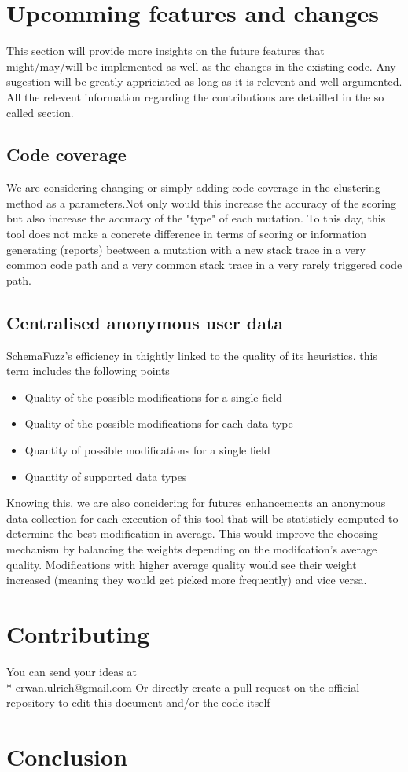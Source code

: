 \documentclass{article}
\begin{document}
\begin{empfile}
	\section{Upcomming features and changes}
This section will provide more insights on the future features that might/may/will be implemented as well as the changes in the existing code.
Any sugestion will be greatly appriciated as long as it is relevent and well argumented. All the relevent information regarding the contributions are detailled in the so called section.
	
		\subsection{Code coverage}
We are considering changing or simply adding code coverage in the clustering method as a parameters.Not only would this increase the accuracy of the scoring but also increase the accuracy of the "type" of each mutation. To this day, this tool does not make a concrete difference in terms of scoring or information generating (reports) beetween a mutation with a new stack trace in a very common code path and a very common stack trace in a very rarely triggered code path.
		\subsection{Centralised anonymous user data}
SchemaFuzz's efficiency in thightly linked to the quality of its heuristics. this term includes the following points 
		\begin{itemize}
		\item{Quality of the possible modifications for a single field}
		\item{Quality of the possible modifications for each data type}
		\item{Quantity of possible modifications for a single field}
		\item{Quantity of supported data types}
		\end{itemize}
Knowing this, we are also concidering for futures enhancements an anonymous data collection  for each execution of this tool that will be statisticly computed to determine the best modification in average. This would improve the choosing mechanism by balancing the weights  depending on the modifcation's average quality. Modifications with higher average quality would see their weight increased (meaning they would get picked more frequently) and vice versa. 			
	\section{Contributing}
You can send your ideas at  \\*
		\url{erwan.ulrich@gmail.com}
Or directly create a pull request on the official repository to edit this document and/or the code itself
	\section{Conclusion}
\end{empfile}
\end{document}
